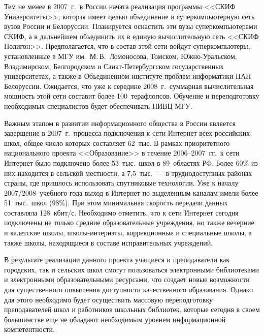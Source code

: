 \begin{multicols}{2}
     Тем не менее в 2007~г.\ в России начата реализация программы <<СКИФ
Университеты>>, которая имеет целью объединение в суперкомпьютерную сеть вузов
России и Белоруссии. Планируется оснастить эти вузы суперкомпьютерами СКИФ, а в
дальнейшем объединить их в единую вычислительную сеть <<СКИФ Полигон>>.
Предполагается, что в состав этой сети войдут суперкомпьютеры, установленные в МГУ
им.~М.\,В.~Ломоносова, Томском, Южно-Уральском, Владимирском, Белгородском и
     Санкт-Петербургском государственных университетах, а также в Объединенном
институте проблем информатики НАН Белоруссии. Ожидается, что уже к середине
2008~г.\ суммарная вычислительная мощность этой сети составит более 100~терафлопсов.
Обучение и переподготовку необходимых специалистов будет обеспечивать НИВЦ МГУ.

     Важным этапом в развитии информационного общества в России является
завершение в 2007~г.\ процесса подключения к сети Интернет всех российских школ,
общее число которых составляет 62~тыс. В рамках приоритетного национального проекта
<<Образование>> в течение 2006--2007~гг.\ к сети Интернет было подключено более
53~тыс.\ школ в 89~областях РФ. Более 60\% из них находится в сельской местности, а
7,5~тыс.~--- в труднодоступных районах страны, где пришлось использовать спутниковые
технологии. Уже к началу 2007/2008~учебного года выход в Интернет по выделенным
каналам имели более 51~тыс.\ школ (98\%). При этом минимальная скорость передачи
данных составляла 128~кбит/с. Необходимо отметить, что к сети Интернет сегодня
подключены не только средние образовательные учреждения, но также вечерние и
кадетские школы, школы-интернаты, коррекционные и специальные школы, а также
школы, находящиеся в составе исправительных учреждений.

     В результате реализации данного проекта учащиеся и преподаватели как городских,
так и сельских школ смогут пользоваться электронными биб\-лио\-те\-ка\-ми и электронными
образовательными %
ресур\-са\-ми, что создает новые возможности для существенного
повышения доступности качественного образования. Однако для этого необходимо будет
осуществить массовую переподготовку преподавателей школ и работников школьных
биб\-лио\-тек, которые сегодня в своем большинстве еще не обладают необходимым уровнем
информационной компетентности.


\end{multicols}

